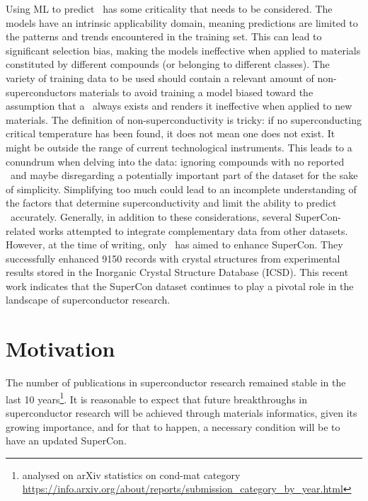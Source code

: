 Using ML to predict \tc~has some criticality that needs to be considered. 
The models have an intrinsic applicability domain, meaning predictions are limited to the patterns and trends encountered in the training set. 
This can lead to significant selection bias, making the models ineffective when applied to materials constituted by different compounds (or belonging to different classes). 
The variety of training data to be used should contain a relevant amount of non-superconductors materials to avoid training a model biased toward the assumption that a \tc~always exists and renders it ineffective when applied to new materials.
The definition of non-superconductivity is tricky: if no superconducting critical temperature has been found, it does not mean one does not exist. It might be outside the range of current technological instruments. 
This leads to a conundrum when delving into the data: ignoring compounds with no reported \tc~and maybe disregarding a potentially important part of the dataset for the sake of simplicity.
Simplifying too much could lead to an incomplete understanding of the factors that determine superconductivity and limit the ability to predict \tc~accurately. 
Generally, in addition to these considerations, several SuperCon-related works attempted to integrate complementary data from other datasets. 
However, at the time of writing, only~\cite{sommer20223dsc} has aimed to enhance SuperCon.  
They successfully enhanced 9150 records with crystal structures from experimental results stored in the Inorganic Crystal Structure Database (ICSD). 
This recent work indicates that the SuperCon dataset continues to play a pivotal role in the landscape of superconductor research.

\section{Motivation}

The number of publications in superconductor research remained stable in the last 10 years\footnote{analysed on arXiv statistics on cond-mat category \url{https://info.arxiv.org/about/reports/submission_category_by_year.html}}.
It is reasonable to expect that future breakthroughs in superconductor research will be achieved through materials informatics, given its growing importance, and for that to happen, a necessary condition will be to have an updated SuperCon. 

